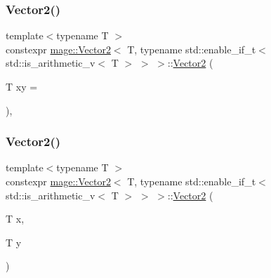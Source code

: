\subsubsection{\texorpdfstring{Vector2()}{Vector2()}\hspace{0.1cm}{\footnotesize\ttfamily [1/6]}}
{\footnotesize\ttfamily template$<$typename T $>$ \\
constexpr \hyperlink{structmage_1_1_vector2}{mage\+::\+Vector2}$<$ T, typename std\+::enable\+\_\+if\+\_\+t$<$ std\+::is\+\_\+arithmetic\+\_\+v$<$ T $>$ $>$ $>$\+::\hyperlink{structmage_1_1_vector2}{Vector2} (\begin{DoxyParamCaption}\item[{T}]{xy = {} }\end{DoxyParamCaption})\hspace{0.3cm}{\ttfamily [explicit]}, {\ttfamily [noexcept]}}

\hypertarget{structmage_1_1_vector2_3_01_t_00_01typename_01std_1_1enable__if__t_3_01std_1_1is__arithmetic__v_3_01_t_01_4_01_4_01_4_a53a1d3a57be55e3560ca42d27240e158}{}\label{structmage_1_1_vector2_3_01_t_00_01typename_01std_1_1enable__if__t_3_01std_1_1is__arithmetic__v_3_01_t_01_4_01_4_01_4_a53a1d3a57be55e3560ca42d27240e158} 
\subsubsection{\texorpdfstring{Vector2()}{Vector2()}\hspace{0.1cm}{\footnotesize\ttfamily [2/6]}}
{\footnotesize\ttfamily template$<$typename T $>$ \\
constexpr \hyperlink{structmage_1_1_vector2}{mage\+::\+Vector2}$<$ T, typename std\+::enable\+\_\+if\+\_\+t$<$ std\+::is\+\_\+arithmetic\+\_\+v$<$ T $>$ $>$ $>$\+::\hyperlink{structmage_1_1_vector2}{Vector2} (\begin{DoxyParamCaption}\item[{T}]{x,  }\item[{T}]{y }\end{DoxyParamCaption})\hspace{0.3cm}{\ttfamily [noexcept]}}

